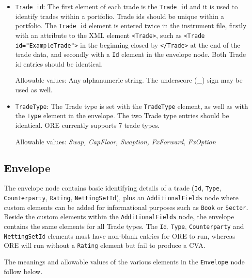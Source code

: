 \begin{itemize}
\item {\tt Trade id}: The first element of each trade is the {\tt Trade id} and it is used to identify trades within a portfolio. Trade ids should be unique within a portfolio.  The {\tt Trade id} element is entered twice in the instrument file, firstly with an attribute to the XML element {\tt <Trade>}, such as {\tt <Trade id="ExampleTrade">}  in the beginning closed by {\tt </Trade>}  at the end of the trade data, and secondly with a {\tt Id} element  in the envelope node.   Both Trade id entries should be identical.

Allowable values:  Any alphanumeric string. The underscore (\_) sign may be used as well. 


\item {\tt TradeType}: The Trade type is set with the {\tt TradeType} element, as well as with the {\tt Type} element in the envelope. The two Trade type entries should be identical. ORE currently supports 7 trade types.  

Allowable values:  \emph{Swap, CapFloor, Swaption, FxForward, FxOption}


\end{itemize}

\subsection{Envelope}\label{ss:envelope}
The envelope node contains basic identifying details of a trade ({\tt Id}, {\tt Type}, {\tt Counterparty}, {\tt Rating}, {\tt NettingSetId}), plus an {\tt AdditionalFields} node where custom elements can be added for informational purposes such as {\tt Book} or {\tt Sector}. Beside the custom elements within the {\tt AdditionalFields} node, the envelope contains the same elements for all Trade types.  The {\tt Id}, {\tt Type}, {\tt Counterparty} and {\tt NettingSetId} elements must have non-blank entries for ORE to run, whereas ORE will run without a {\tt Rating} element but fail to produce a CVA.

The meanings and allowable values of the various elements in the \lstinline!Envelope!  node follow below.

